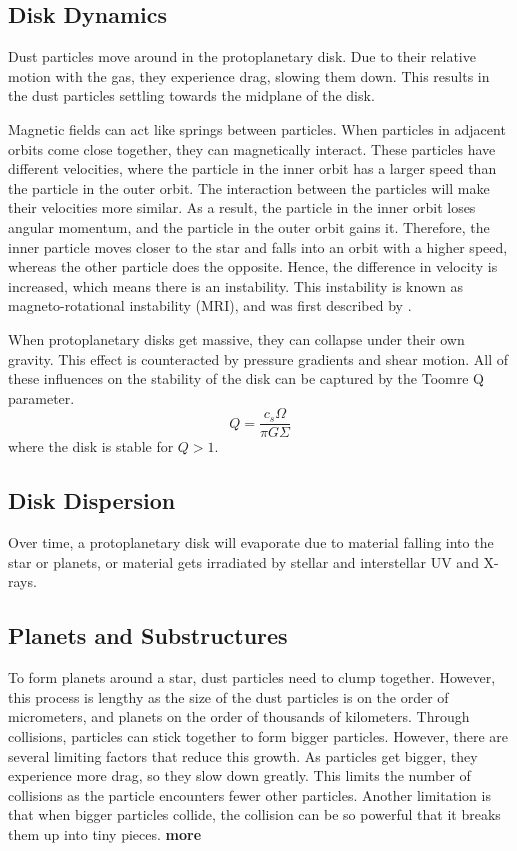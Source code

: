 \documentclass[twoside, single, authoryear, semicolon, 12pt]{lion-msc}
\newcommand{\4}{$_4$}
\newcommand{\3}{$_3$}
\newcommand{\2}{$_2$}
\begin{document}
\subsection{Disk Dynamics}
Dust particles move around in the protoplanetary disk. Due to their relative motion with the gas, they experience drag, slowing them down. This results in the dust particles settling towards the midplane of the disk. 

Magnetic fields can act like springs between particles. When particles in adjacent orbits come close together, they can magnetically interact. These particles have different velocities, where the particle in the inner orbit has a larger speed than the particle in the outer orbit. The interaction between the particles will make their velocities more similar. As a result, the particle in the inner orbit loses angular momentum, and the particle in the outer orbit gains it. Therefore, the inner particle moves closer to the star and falls into an orbit with a higher speed, whereas the other particle does the opposite. Hence, the difference in velocity is increased, which means there is an instability. This instability is known as magneto-rotational instability (MRI), and was first described by \cite{RevModPhys.70.1}. 

When protoplanetary disks get massive, they can collapse under their own gravity. This effect is counteracted by pressure gradients and shear motion. All of these influences on the stability of the disk can be captured by the Toomre Q parameter.
\begin{equation}
    Q = \frac{c_s\Omega}{\pi G\Sigma}
\end{equation}
where the disk is stable for $Q>1$.

\subsection{Disk Dispersion}
Over time, a protoplanetary disk will evaporate due to material falling into the star or planets, or material gets irradiated by stellar and interstellar UV and X-rays. 


\subsection{Planets and Substructures}
To form planets around a star, dust particles need to clump together. However, this process is lengthy as the size of the dust particles is on the order of micrometers, and planets on the order of thousands of kilometers. Through collisions, particles can stick together to form bigger particles. However, there are several limiting factors that reduce this growth. As particles get bigger, they experience more drag, so they slow down greatly. This limits the number of collisions as the particle encounters fewer other particles. Another limitation is that when bigger particles collide, the collision can be so powerful that it breaks them up into tiny pieces. 
\textbf{more}
\end{document}
